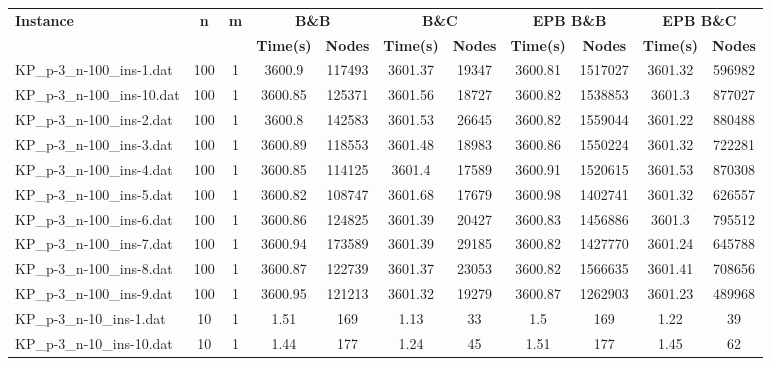\begin{table}[!ht]
\centering
\hspace*{-1cm}\begin{tabular}{lcccccccccc}
\toprule
\textbf{Instance} & \textbf{n} & \textbf{m} & \multicolumn{2}{c}{\textbf{B\&B}} & \multicolumn{2}{c}{\textbf{B\&C}}  & \multicolumn{2}{c}{\textbf{EPB B\&B}} & \multicolumn{2}{c}{\textbf{EPB B\&C}} \\

\cmidrule(r){4-5} \cmidrule(r){6-7} \cmidrule(r){8-9} \cmidrule(r){10-11} 
~ & ~ & ~ & \textbf{Time(s)} &\textbf{Nodes} & \textbf{Time(s)} &\textbf{Nodes} & \textbf{Time(s)} &\textbf{Nodes} & \textbf{Time(s)} &\textbf{Nodes}  \\
\midrule

KP\_p-3\_n-100\_ins-1.dat & 100 & 1 & 3600.9 & 117493 & 3601.37 & 19347 & 3600.81 & 1517027 & 3601.32 & 596982 \\
KP\_p-3\_n-100\_ins-10.dat & 100 & 1 & 3600.85 & 125371 & 3601.56 & 18727 & 3600.82 & 1538853 & 3601.3 & 877027 \\
KP\_p-3\_n-100\_ins-2.dat & 100 & 1 & 3600.8 & 142583 & 3601.53 & 26645 & 3600.82 & 1559044 & 3601.22 & 880488 \\
KP\_p-3\_n-100\_ins-3.dat & 100 & 1 & 3600.89 & 118553 & 3601.48 & 18983 & 3600.86 & 1550224 & 3601.32 & 722281 \\
KP\_p-3\_n-100\_ins-4.dat & 100 & 1 & 3600.85 & 114125 & 3601.4 & 17589 & 3600.91 & 1520615 & 3601.53 & 870308 \\
KP\_p-3\_n-100\_ins-5.dat & 100 & 1 & 3600.82 & 108747 & 3601.68 & 17679 & 3600.98 & 1402741 & 3601.32 & 626557 \\
KP\_p-3\_n-100\_ins-6.dat & 100 & 1 & 3600.86 & 124825 & 3601.39 & 20427 & 3600.83 & 1456886 & 3601.3 & 795512 \\
KP\_p-3\_n-100\_ins-7.dat & 100 & 1 & 3600.94 & 173589 & 3601.39 & 29185 & 3600.82 & 1427770 & 3601.24 & 645788 \\
KP\_p-3\_n-100\_ins-8.dat & 100 & 1 & 3600.87 & 122739 & 3601.37 & 23053 & 3600.82 & 1566635 & 3601.41 & 708656 \\
KP\_p-3\_n-100\_ins-9.dat & 100 & 1 & 3600.95 & 121213 & 3601.32 & 19279 & 3600.87 & 1262903 & 3601.23 & 489968 \\
KP\_p-3\_n-10\_ins-1.dat & 10 & 1 & 1.51 & 169 & 1.13 & 33 & 1.5 & 169 & 1.22 & 39 \\
KP\_p-3\_n-10\_ins-10.dat & 10 & 1 & 1.44 & 177 & 1.24 & 45 & 1.51 & 177 & 1.45 & 62 \\

\end{tabular}
\end{table}

